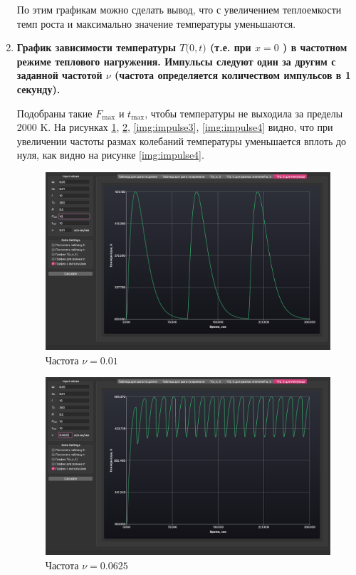\begin{enumerate}
        По этим графикам можно сделать вывод, что с увеличением теплоемкости темп роста и максимально значение температуры уменьшаются.

    \item \textbf{График зависимости температуры $T\big( 0, t \big)$ (т.е. при $x = 0$ ) в частотном режиме теплового нагружения. Импульсы следуют один за другим с заданной частотой $\nu$ (частота определяется количеством импульсов в 1 секунду).}

        Подобраны такие $F_\text{max}$ и $t_\text{max}$, чтобы температуры не выходила за пределы 2000 K. На рисунках \ref{img:impulse1}, \ref{img:impulse2}, \ref{img:impulse3}, \ref{img:impulse4} видно, что при увеличении частоты размах колебаний температуры уменьшается вплоть до нуля, как видно на рисунке \ref{img:impulse4}.

        \begin{figure}[H]
            \centering
            \includegraphics[scale=0.35]{img/impulse1.png}
            \caption{Частота $\nu = 0.01$}
            \label{img:impulse1}
        \end{figure}

        \begin{figure}[H]
            \centering
            \includegraphics[scale=0.35]{img/impulse2.png}
            \caption{Частота $\nu = 0.0625$}
            \label{img:impulse2}
        \end{figure}


\end{enumerate}
